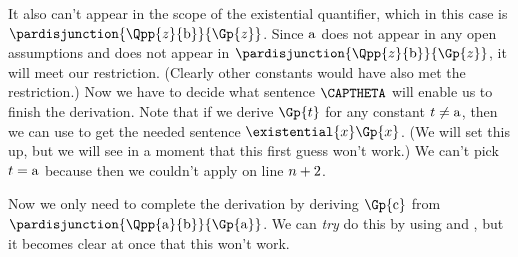 It also can't appear in the scope of the existential quantifier, which in this case is $\pardisjunction{\Qpp{\variable{z}}{\constant{b}}}{\Gp{\variable{z}}}$. 
Since $\mathrm{a}$ does not appear in any open assumptions and does not appear in $\pardisjunction{\Qpp{\variable{z}}{\constant{b}}}{\Gp{\variable{z}}}$, it will meet our restriction.
(Clearly other constants would have also met the restriction.)
Now we have to decide what sentence $\CAPTHETA$ will enable us to finish the derivation. 
Note that if we derive $\Gp{\variable{t}}$ for any constant $t\neq\mathrm{a}$, then we can use  to get the needed sentence $\existential{\variable{x}}\Gp{\variable{x}}$. 
(We will set this up, but we will see in a moment that this first guess won't work.)
We can't pick $t=\mathrm{a}$ because then we couldn't apply  on line $n+2$.
\begin{gproof}[\label{GQDExampleJ}]
\end{gproof}
Now we only need to complete the derivation by deriving $\Gp{\constant{c}}$ from $\pardisjunction{\Qpp{\constant{a}}{\constant{b}}}{\Gp{\constant{a}}}$. 
We can \emph{try} do this by using  and , but it becomes clear at once that this won't work.
\begin{gproof}[\label{GQDExampleK}]
\end{gproof}
